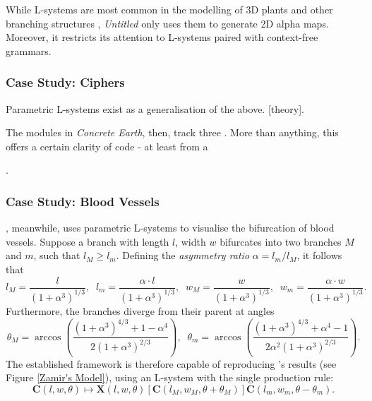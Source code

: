\documentclass[a4paper, 11pt]{article}
\begin{document}
\begin{flushleft}
\vspace{5pt}\noindent
While L-systems are most common in the modelling of 3D plants and other branching structures \citep{prusinkiewiczAlgorithmicBeauty}, \textit{Untitled} only uses them to generate 2D alpha maps. Moreover, it restricts its attention to L-systems paired with context-free grammars.

\subsubsection{Case Study: Ciphers}

Parametric L-systems \citep{hananParametricLSystems} exist as a generalisation of the above. [theory].

\vspace{5pt}\noindent
The modules in \textit{Concrete Earth}, then, track three . More than anything, this offers a certain clarity of code - at least from a 

\vspace{5pt}.

\subsubsection{Case Study: Blood Vessels} %

\citet{zamirArterialBranchingLSystems}, meanwhile, uses parametric L-systems to visualise the bifurcation of blood vessels. Suppose a branch with length $l$, width $w$ bifurcates into two branches $M$ and $m$, such that $l_M \geq l_m$. Defining the \textit{asymmetry ratio} $\alpha = l_m/l_M$, it follows that
$$l_M = \frac{l}{\left(1+\alpha^3\right)^{1/3}}, \;\; l_m = \frac{\alpha\cdot l}{\left(1+\alpha^3\right)^{1/3}}, \;\; w_M = \frac{w}{\left(1+\alpha^3\right)^{1/3}}, \;\; w_m = \frac{\alpha\cdot w}{\left(1+\alpha^3\right)^{1/3}}.$$
Furthermore, the branches diverge from their parent at angles
$$\theta_M = \arccos\left(\frac{\left(1+\alpha^3\right)^{4/3}+1-\alpha^4}{2\left(1+\alpha^3\right)^{2/3}}\right), \;\; \theta_m = \arccos\left(\frac{\left(1+\alpha^3\right)^{4/3}+\alpha^4-1}{2\alpha^2\left(1+\alpha^3\right)^{2/3}}\right).$$
The established framework is therefore capable of reproducing \citeauthor{zamirArterialBranchingLSystems}'s results (see Figure \ref{Zamir's Model}), using an L-system with the single production rule:  
$$\mathbf{C}(l,w,\theta) \mapsto \mathbf{X}(l,w,\theta)[\mathbf{C}(l_M,w_M,\theta+\theta_M)]\mathbf{C}(l_m,w_m,\theta-\theta_m).$$


\end{flushleft}
\end{document}
